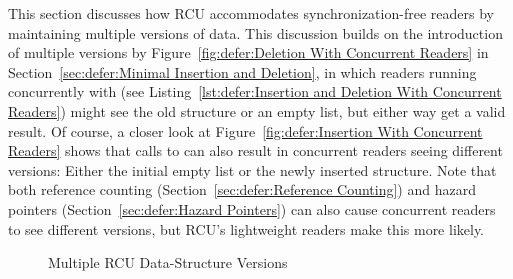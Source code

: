 This section discusses how RCU accommodates synchronization-free readers
by maintaining multiple versions of data.
This discussion builds on the introduction of multiple versions by
Figure~\ref{fig:defer:Deletion With Concurrent Readers}
in
Section~\ref{sec:defer:Minimal Insertion and Deletion},
in which readers running concurrently with 
(see Listing~\ref{lst:defer:Insertion and Deletion With Concurrent Readers})
might see the old  structure or an empty list, but either
way get a valid result.
Of course, a closer look at
Figure~\ref{fig:defer:Insertion With Concurrent Readers}
shows that calls to  can also result in concurrent
readers seeing different versions: Either the initial empty list
or the newly inserted  structure.
Note that both reference counting
(Section~\ref{sec:defer:Reference Counting})
and hazard pointers
(Section~\ref{sec:defer:Hazard Pointers})
can also cause concurrent readers to see different versions, but
RCU's lightweight readers make this more likely.

\begin{figure}[tbp]
\centering
{}
\caption{Multiple RCU Data-Structure Versions}
\label{fig:defer:Multiple RCU Data-Structure Versions}
\end{figure}

